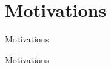 \section{Motivations}
\begin{frame}{Motivations}
\end{frame}

\begin{frame}{Motivations}
\end{frame}

